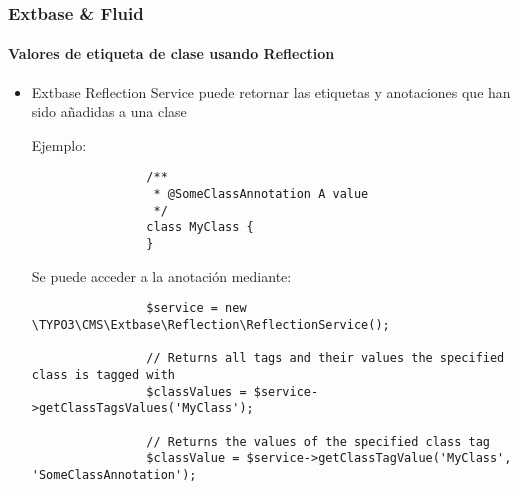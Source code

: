 \begin{frame}[fragile]
	\frametitle{Extbase \& Fluid}
	\framesubtitle{Valores de etiqueta de clase usando Reflection}

	\lstset{
		basicstyle=\tiny\ttfamily
	}

	\begin{itemize}
		\item Extbase Reflection Service puede retornar las etiquetas y anotaciones que han sido añadidas a una clase\newline

			Ejemplo:
			\begin{lstlisting}
				/**
				 * @SomeClassAnnotation A value
				 */
				class MyClass {
				}
			\end{lstlisting}

			Se puede acceder a la anotación mediante:
			\begin{lstlisting}
				$service = new \TYPO3\CMS\Extbase\Reflection\ReflectionService();

				// Returns all tags and their values the specified class is tagged with
				$classValues = $service->getClassTagsValues('MyClass');

				// Returns the values of the specified class tag
				$classValue = $service->getClassTagValue('MyClass', 'SomeClassAnnotation');
			\end{lstlisting}

	\end{itemize}

\end{frame}

